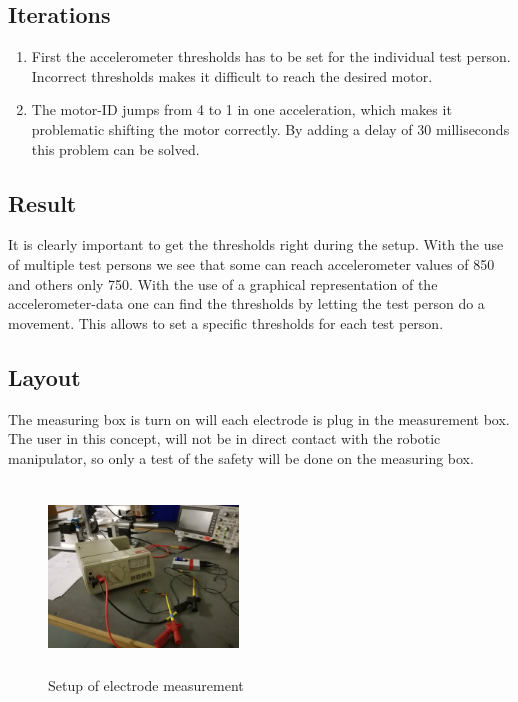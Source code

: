 \subsection*{Iterations}
\begin{enumerate}
    \item First the accelerometer thresholds has to be set for the individual test person. Incorrect thresholds makes it difficult to reach the desired motor. 
    \item The motor-ID jumps from 4 to 1 in one acceleration, which makes it problematic shifting the motor correctly. By adding a delay of 30 milliseconds this problem can be solved.
\end{enumerate}
\subsection*{Result}
It is clearly important to get the thresholds right during the setup. With the use of multiple test persons we see that some can reach accelerometer values of 850 and others only 750. With the use of a graphical representation of the accelerometer-data one can find the thresholds by letting the test person do a movement. This allows to set a specific thresholds for each test person.
\newpage

\subsection*{Layout}
 The measuring box is turn on will each electrode is plug in the measurement box. The user in this concept, will not be in direct contact with the robotic manipulator, so only a test of the safety will be done on the measuring box.
 \begin{figure}[H]
     \centering
     \includegraphics[width=0.45\textwidth, height=5cm]{Figures/Technical_figures/safetysetup.jpg}
     \caption{Setup of electrode measurement}
     \label{fig:my_label}
 \end{figure}
